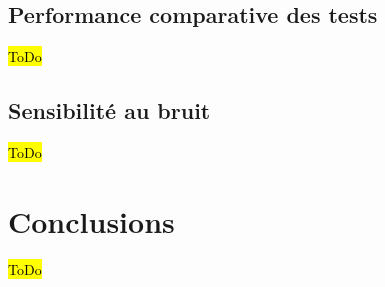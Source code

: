 \documentclass{article}
\begin{document}
\subsection{Performance comparative des tests}

\hl{ToDo}

\subsection{Sensibilité au bruit}

\hl{ToDo}



\section{Conclusions}

\hl{ToDo}



\end{document}
